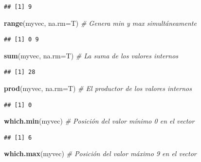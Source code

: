 \documentclass[10pt,]{krantz}
\makeatletter
\newenvironment{Shaded}{\begin{snugshade}}{\end{snugshade}}
\newcommand{\KeywordTok}[1]{\textcolor[rgb]{0.13,0.29,0.53}{\textbf{#1}}}
\newcommand{\DataTypeTok}[1]{\textcolor[rgb]{0.13,0.29,0.53}{#1}}
\newcommand{\CommentTok}[1]{\textcolor[rgb]{0.56,0.35,0.01}{\textit{#1}}}
\newcommand{\NormalTok}[1]{#1}
\newenvironment{kframe}{%
\medskip{}
\setlength{\fboxsep}{.8em}
 \def\at@end@of@kframe{}%
 \ifinner\ifhmode%
  \def\at@end@of@kframe{\end{minipage}}%
  \begin{minipage}{\columnwidth}%
 \fi\fi%
 \def\FrameCommand##1{\hskip\@totalleftmargin \hskip-\fboxsep
 \colorbox{shadecolor}{##1}\hskip-\fboxsep
     \hskip-\linewidth \hskip-\@totalleftmargin \hskip\columnwidth}%
 \MakeFramed {\advance\hsize-\width
   \@totalleftmargin\z@ \linewidth\hsize
   \@setminipage}}%
 {\par\unskip\endMakeFramed%
 \at@end@of@kframe}
\renewenvironment{Shaded}{\begin{kframe}}{\end{kframe}}
\makeatother
\begin{document}
\begin{verbatim}
## [1] 9
\end{verbatim}

\begin{Shaded}
\begin{Highlighting}[]
\KeywordTok{range}\NormalTok{(myvec, }\DataTypeTok{na.rm=}\NormalTok{T)  }\CommentTok{# Genera min y max simultáneamente}
\end{Highlighting}
\end{Shaded}

\begin{verbatim}
## [1] 0 9
\end{verbatim}

\begin{Shaded}
\begin{Highlighting}[]
\KeywordTok{sum}\NormalTok{(myvec, }\DataTypeTok{na.rm=}\NormalTok{T)  }\CommentTok{# La suma de los valores internos}
\end{Highlighting}
\end{Shaded}

\begin{verbatim}
## [1] 28
\end{verbatim}

\begin{Shaded}
\begin{Highlighting}[]
\KeywordTok{prod}\NormalTok{(myvec, }\DataTypeTok{na.rm=}\NormalTok{T)  }\CommentTok{# El productor de los valores internos}
\end{Highlighting}
\end{Shaded}

\begin{verbatim}
## [1] 0
\end{verbatim}

\begin{Shaded}
\begin{Highlighting}[]
\KeywordTok{which.min}\NormalTok{(myvec)  }\CommentTok{# Posición del valor mínimo 0 en el vector}
\end{Highlighting}
\end{Shaded}

\begin{verbatim}
## [1] 6
\end{verbatim}

\begin{Shaded}
\begin{Highlighting}[]
\KeywordTok{which.max}\NormalTok{(myvec)  }\CommentTok{# Posición del valor máximo 9 en el vector}
\end{Highlighting}
\end{Shaded}
\end{document}
